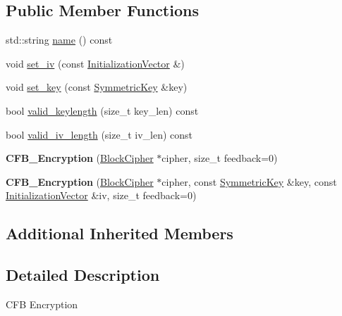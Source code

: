 \subsection*{Public Member Functions}
\begin{DoxyCompactItemize}
\item 
std\-::string \hyperlink{classBotan_1_1CFB__Encryption_a9acb2736f16ac07c949d58caae76ad86}{name} () const 
\item 
void \hyperlink{classBotan_1_1CFB__Encryption_acc9236c1bcf0dcc05b03ed4011a371ef}{set\-\_\-iv} (const \hyperlink{namespaceBotan_ab6a07e859c4e3a2ccfd68308ec89497e}{Initialization\-Vector} \&)
\item 
void \hyperlink{classBotan_1_1CFB__Encryption_a4302ad254ff749ef03efa426b8922f35}{set\-\_\-key} (const \hyperlink{namespaceBotan_a00c78597211d5c63b63e2a57ddb96d38}{Symmetric\-Key} \&key)
\item 
bool \hyperlink{classBotan_1_1CFB__Encryption_aa78b4c58c2ae9967aec8301be9310225}{valid\-\_\-keylength} (size\-\_\-t key\-\_\-len) const 
\item 
bool \hyperlink{classBotan_1_1CFB__Encryption_a1e407f30633ed47768bfefead2e0acfb}{valid\-\_\-iv\-\_\-length} (size\-\_\-t iv\-\_\-len) const 
\item 
\hypertarget{classBotan_1_1CFB__Encryption_a79954b1621b346adf1b3e3a644cd497d}{{\bfseries C\-F\-B\-\_\-\-Encryption} (\hyperlink{classBotan_1_1BlockCipher}{Block\-Cipher} $\ast$cipher, size\-\_\-t feedback=0)}\label{classBotan_1_1CFB__Encryption_a79954b1621b346adf1b3e3a644cd497d}

\item 
\hypertarget{classBotan_1_1CFB__Encryption_a6cbe63b5fb17b45157ace44ba01ae2e7}{{\bfseries C\-F\-B\-\_\-\-Encryption} (\hyperlink{classBotan_1_1BlockCipher}{Block\-Cipher} $\ast$cipher, const \hyperlink{namespaceBotan_a00c78597211d5c63b63e2a57ddb96d38}{Symmetric\-Key} \&key, const \hyperlink{namespaceBotan_ab6a07e859c4e3a2ccfd68308ec89497e}{Initialization\-Vector} \&iv, size\-\_\-t feedback=0)}\label{classBotan_1_1CFB__Encryption_a6cbe63b5fb17b45157ace44ba01ae2e7}

\end{DoxyCompactItemize}
\subsection*{Additional Inherited Members}


\subsection{Detailed Description}
C\-F\-B Encryption 


